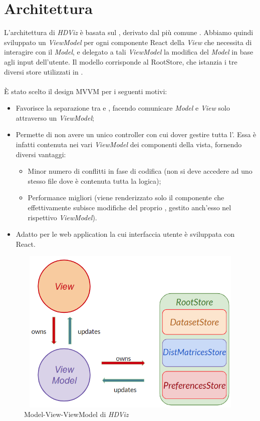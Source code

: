 \section{Architettura}
L'architettura di \textit{HDViz} è basata sul  , derivato dal più comune . 
Abbiamo quindi sviluppato un \textit{ViewModel} per ogni componente React della \textit{View} che necessita di interagire con il \textit{Model}, e delegato a tali \textit{ViewModel} la modifica del \textit{Model} in base agli input dell'utente. 
Il modello corrisponde al RootStore, che istanzia i tre diversi store utilizzati in \NomeProgetto{}. \\ \mbox{}\\
È stato scelto il design MVVM per i seguenti motivi: 
\begin{itemize}
	\item Favorisce la separazione tra  e , facendo comunicare \textit{Model} e \textit{View} solo attraverso un \textit{ViewModel};  
	\item Permette di non avere un unico controller con cui dover gestire tutta l'. Essa è infatti contenuta nei vari \textit{ViewModel} dei componenti della vista, fornendo diversi vantaggi: 
	\begin{itemize}
		\item Minor numero di conflitti in fase di codifica (non si deve accedere ad uno stesso file dove è contenuta tutta la logica);
		\item Performance migliori (viene renderizzato solo il componente che effettivamente subisce modifiche del proprio , gestito anch'esso nel rispettivo \textit{ViewModel}).
	\end{itemize}
	\item Adatto per le web application la cui interfaccia utente è sviluppata con React.
\end{itemize}

\begin{figure}[hb]
\includegraphics[width=11.8cm,height=8cm]{Extra/MVVMPattern}
\centering
\caption{Model-View-ViewModel di \textit{HDViz}}
\end{figure}

\newpage

\newpage

\newpage

\newpage

